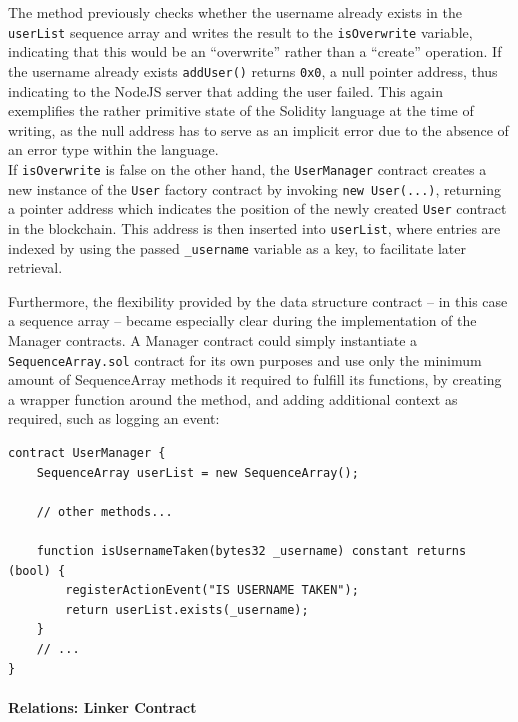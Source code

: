 \documentclass[12pt]{report}
\let\oldparagraph\paragraph
\renewcommand{\paragraph}[1]{\oldparagraph{#1}\mbox{}}
\begin{document}
The method previously checks whether the username already exists in the
\texttt{userList} sequence array and writes the result to the
\texttt{isOverwrite} variable, indicating that this would be an
``overwrite'' rather than a ``create'' operation. If the username
already exists \texttt{addUser()} returns \texttt{0x0}, a null pointer
address, thus indicating to the NodeJS server that adding the user
failed. This again exemplifies the rather primitive state of the
Solidity language at the time of writing, as the null address has to
serve as an implicit error due to the absence of an error type within
the language.\\
If \texttt{isOverwrite} is false on the other hand, the
\texttt{UserManager} contract creates a new instance of the
\texttt{User} factory contract by invoking \texttt{new\ User(...)},
returning a pointer address which indicates the position of the newly
created \texttt{User} contract in the blockchain. This address is then
inserted into \texttt{userList}, where entries are indexed by using the
passed \texttt{\_username} variable as a key, to facilitate later
retrieval.

Furthermore, the flexibility provided by the data structure contract --
in this case a sequence array -- became especially clear during the
implementation of the Manager contracts. A Manager contract could simply
instantiate a \texttt{SequenceArray.sol} contract for its own purposes
and use only the minimum amount of SequenceArray methods it required to
fulfill its functions, by creating a wrapper function around the method,
and adding additional context as required, such as logging an event:

\begin{verbatim}
contract UserManager {
    SequenceArray userList = new SequenceArray();

    // other methods...

    function isUsernameTaken(bytes32 _username) constant returns (bool) {
        registerActionEvent("IS USERNAME TAKEN");
        return userList.exists(_username);
    }
    // ...
}
\end{verbatim}

\paragraph{Relations: Linker Contract}\label{relations-linker-contract}
\end{document}
